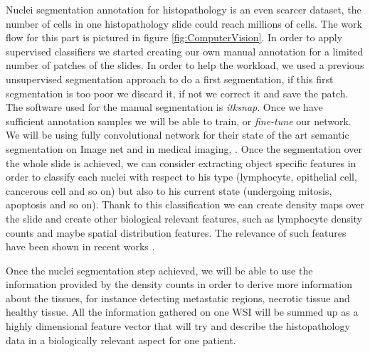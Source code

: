 \documentclass[a4paper,10pt,twocolumn]{article}
\begin{document}
Nuclei segmentation annotation for histopathology is an even scarcer dataset, the number of
 cells in one histopathology slide could reach millions of cells. The work flow for this part is
 pictured in figure \ref{fig:ComputerVision}. In order to apply supervised classifiers we started
 creating our own manual annotation for a limited number of patches of the slides. In order to 
 help the workload, we used a previous unsupervised segmentation approach to do a first 
 segmentation, if this first segmentation is too poor we discard it, if not we correct it and save 
 the patch. The software used for the manual segmentation is \textit{itksnap}. Once we have 
 sufficient annotation samples we will be able to train, or \textit{fine-tune} our network. We 
 will be using fully convolutional network for their state of the art semantic segmentation on  
 Image net \citep{long2015fcn} and in medical imaging, \citep{UNet}. Once the segmentation over the 
 whole slide is achieved, we can consider extracting object specific features in order to classify 
 each nuclei with respect to his type  (lymphocyte, epithelial cell, cancerous cell and so on) but 
 also to his current state (undergoing mitosis, apoptosis and so on). Thank to this classification we can create density maps over the slide and create other biological relevant features, such as lymphocyte density counts and maybe spatial distribution features. The relevance of such features have been shown in recent works \cite{yuan2012quantitative, lee2015supervised}. 
 
 
 Once the nuclei segmentation step achieved, we will be able to use the information provided by the density counts in order to derive more information about the tissues, for instance detecting metastatic regions, necrotic tissue and healthy tissue. All the information gathered on one WSI will be summed up as a highly dimensional feature vector that will try and describe the histopathology data in a biologically relevant aspect for one patient.
 
\end{document}
